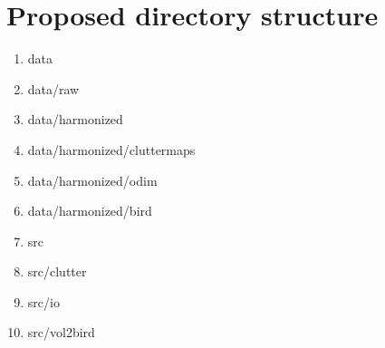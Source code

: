 


\section{Proposed directory structure}

\begin{enumerate}
\item{data}
\item{data/raw}
\item{data/harmonized}
\item{data/harmonized/cluttermaps}
\item{data/harmonized/odim}
\item{data/harmonized/bird}
\item{src}
\item{src/clutter}
\item{src/io}
\item{src/vol2bird}
\end{enumerate}



